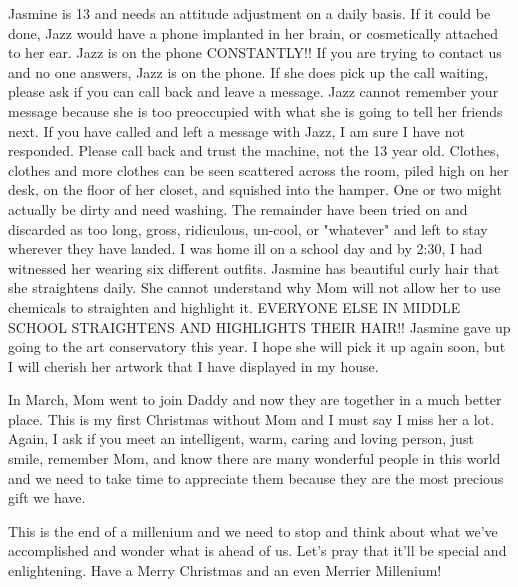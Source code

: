 Jasmine is 13 and needs an attitude adjustment on a daily basis.  If it could be done, Jazz would have a phone implanted in her brain, or
cosmetically attached to her ear.  Jazz is on the phone CONSTANTLY!!  If you are trying to contact us and no one answers,  Jazz is on the phone.
If she does pick up the call waiting,  please ask if you can call back and leave a message.  Jazz cannot remember your message because she is
too preoccupied with what she is going to tell her friends next.  If you have called and left a message with Jazz, I am sure I have not
responded.  Please call back and trust the machine, not the 13 year old.  Clothes, clothes and more clothes can be seen scattered across the
room, piled high on her desk, on the floor of her closet, and squished into the hamper. One or two might actually be dirty and need washing.
The remainder have been tried on and discarded as too long, gross, ridiculous, un-cool, or "whatever" and left to stay wherever they have
landed.  I was home ill on a school day and by 2:30, I had witnessed her wearing six different outfits. Jasmine has beautiful curly hair that
she straightens daily.  She cannot understand why Mom will not allow her to use chemicals to straighten and highlight it.  EVERYONE ELSE IN
MIDDLE SCHOOL STRAIGHTENS AND HIGHLIGHTS THEIR HAIR!!  Jasmine gave up going to the art conservatory this year.  I hope she will pick it up
again soon, but I will cherish her artwork that I have displayed in my house.

In March, Mom went to join Daddy and now they are together in a much better place.  This is my first Christmas without Mom and I must say I miss
her a lot. Again, I ask if you meet an intelligent, warm, caring and loving person, just smile, remember Mom, and know there are many wonderful
people in this world and we need to take time to appreciate them because they are the most precious gift we have.

This is the end of a millenium and we need to stop and think about what we've accomplished and wonder what is ahead of us.  Let's pray that
it'll be special and enlightening.  Have a Merry Christmas and an even Merrier Millenium!



%
